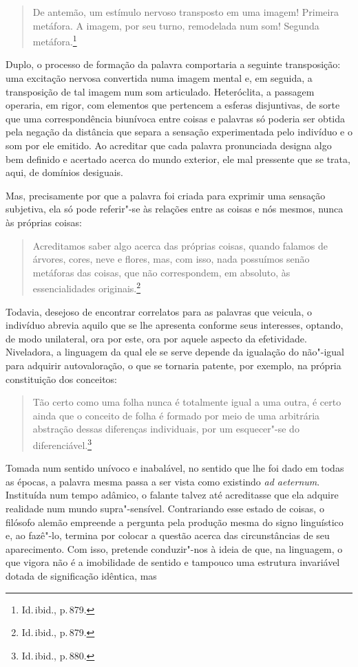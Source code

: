 \begin{quote}
De antemão, um estímulo nervoso transposto em uma imagem!
Primeira metáfora. A imagem, por seu turno, remodelada num som! Segunda
metáfora.\footnote{ Id.\,ibid., p.\,879.} 
\end{quote}

Duplo, o processo de formação
da palavra comportaria a seguinte transposição: uma excitação nervosa
convertida numa imagem mental e, em seguida, a transposição de tal
imagem num som articulado. Heteróclita, a passagem operaria, em rigor,
com elementos que pertencem a esferas disjuntivas, de sorte
que uma correspondência biunívoca entre coisas e palavras só poderia
ser obtida pela negação da distância que separa a sensação
experimentada pelo indivíduo e o som por ele emitido. Ao acreditar que
cada palavra pronunciada designa algo bem definido e acertado acerca do
mundo exterior, ele mal pressente que se trata, aqui, de domínios desiguais.

Mas, precisamente por que a palavra foi criada para exprimir uma
sensação subjetiva, ela só pode referir"-se às relações entre as
coisas e nós mesmos, nunca às próprias coisas: 

\begin{quote}
Acreditamos saber algo
acerca das próprias coisas, quando falamos de árvores, cores, neve e
flores, mas, com isso, nada possuímos senão metáforas das coisas, que
não correspondem, em absoluto, às essencialidades originais.\footnote{
Id.\,ibid., p.\,879.}
\end{quote}

Todavia, desejoso de encontrar correlatos para as
palavras que veicula, o indivíduo abrevia aquilo que se lhe apresenta
conforme seus interesses, optando, de modo unilateral, ora por este,
ora por aquele aspecto da efetividade. Niveladora, a linguagem da qual
ele se serve depende da igualação do não"-igual para adquirir
autovaloração, o que se tornaria patente, por exemplo, na própria
constituição dos conceitos: 
\begin{quote}
Tão certo como uma folha
nunca é totalmente igual a uma outra, é certo ainda que o conceito de
folha é formado por meio de uma arbitrária abstração dessas diferenças
individuais, por um esquecer"-se 
do diferenciável.\footnote{ Id.\,ibid., p.\,880.}
\end{quote}

Tomada num sentido unívoco e inabalável, no sentido que lhe foi dado em
todas as épocas, a palavra mesma passa a ser vista como existindo
\textit{ad aeternum}. Instituída num tempo adâmico, o falante talvez
até acreditasse que ela adquire realidade num mundo
supra"-sensível. Contrariando esse estado de coisas, o filósofo alemão
empreende a pergunta pela produção mesma do signo linguístico e, ao
fazê"-lo, termina por colocar a questão acerca das circunstâncias de
seu aparecimento. Com isso, pretende conduzir"-nos à ideia de que, na
linguagem, o que vigora não é a imobilidade de sentido e tampouco uma
estrutura invariável dotada de significação idêntica, mas 

